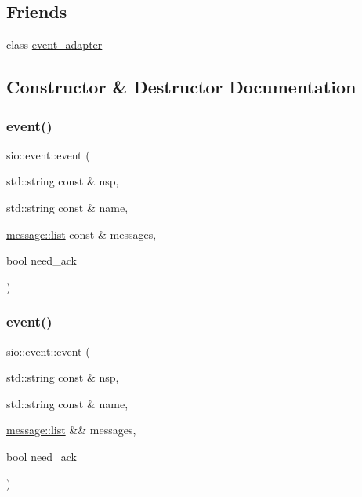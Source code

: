 \subsection*{Friends}
\begin{DoxyCompactItemize}
\item 
class \hyperlink{classsio_1_1event_ac57524faa4b3dfacdf1bceec92894a03}{event\+\_\+adapter}
\end{DoxyCompactItemize}


\subsection{Constructor \& Destructor Documentation}
\mbox{\label{classsio_1_1event_a33a61e908fbc2fec7273db572b77fbd2}} 
\subsubsection{\texorpdfstring{event()}{event()}\hspace{0.1cm}{\footnotesize\ttfamily [1/2]}}
{\footnotesize\ttfamily sio\+::event\+::event (\begin{DoxyParamCaption}\item[{std\+::string const \&}]{nsp,  }\item[{std\+::string const \&}]{name,  }\item[{\hyperlink{classsio_1_1message_1_1list}{message\+::list} const \&}]{messages,  }\item[{bool}]{need\+\_\+ack }\end{DoxyParamCaption})\hspace{0.3cm}{\ttfamily [protected]}}

\mbox{\label{classsio_1_1event_a6f053dd419d8260c4ec28f278504ab19}} 
\subsubsection{\texorpdfstring{event()}{event()}\hspace{0.1cm}{\footnotesize\ttfamily [2/2]}}
{\footnotesize\ttfamily sio\+::event\+::event (\begin{DoxyParamCaption}\item[{std\+::string const \&}]{nsp,  }\item[{std\+::string const \&}]{name,  }\item[{\hyperlink{classsio_1_1message_1_1list}{message\+::list} \&\&}]{messages,  }\item[{bool}]{need\+\_\+ack }\end{DoxyParamCaption})\hspace{0.3cm}{\ttfamily [protected]}}



